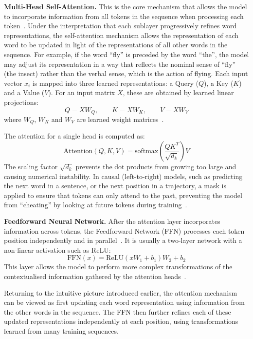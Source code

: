 ﻿\documentclass[12pt,a4paper]{article}
\let\oldcite\cite
\renewcommand{\cite}[1]{\mbox{\oldcite{#1}}}
\theoremstyle{definition}
\begin{document}
\textbf{\small Multi-Head Self-Attention.} This is the core mechanism that allows the model to incorporate information from all tokens in the sequence
when processing each token~\cite{jurafsky2026speech}. Under the interpretation that each sublayer progressively 
refines word representations, the self-attention mechanism allows the representation of each word to be updated in 
light of the representations of all other words in the sequence. For example, if the word ``fly'' is preceded by the 
word ``the'', the model may adjust its representation in a way that reflects the nominal sense of ``fly'' (the insect)
rather than the verbal sense, which is the action of flying.
Each input vector $x_i$ is mapped into three learned representations: a Query ($Q$), a Key ($K$) and a Value ($V$).
For an input matrix $X$, these are obtained by learned linear projections:
\begin{equation}
Q = XW_Q,\qquad K = XW_K,\qquad V = XW_V
\end{equation}
where $W_Q$, $W_K$ and $W_V$ are learned weight matrices~\cite{jurafsky2026speech}.

The attention for a single head is computed as:
\begin{equation}
\mathrm{Attention}(Q, K, V) = \mathrm{softmax}\left(\frac{QK^T}{\sqrt{d_k}}\right)V
\end{equation}
The scaling factor $\sqrt{d_k}$ prevents the dot products from growing too large and causing numerical 
instability. In causal (left-to-right) models, such as predicting the next word in a sentence, or the next position
in a trajectory, a mask is applied to ensure that tokens can only attend to the 
past, preventing the model from ``cheating'' by looking at future tokens during training~\cite{jurafsky2026speech}.

\textbf{\small Feedforward Neural Network.} After the attention layer incorporates information across tokens, the Feedforward Network (FFN) processes each token position 
independently and in parallel~\cite{jurafsky2026speech}. It is usually a two-layer network with a non-linear activation such as ReLU:
\begin{equation}
\mathrm{FFN}(x) = \mathrm{ReLU}(xW_1 + b_1)W_2 + b_2
\end{equation}
This layer allows the model to perform more complex transformations of the contextualised information
gathered by the attention heads~\cite{jurafsky2026speech}. 

Returning to the intuitive picture introduced earlier, the attention mechanism can be viewed as first 
updating each word representation using information from the other words in the sequence. The FFN then 
further refines each of these updated representations independently at each position, using transformations 
learned from many training sequences.
\end{document}
